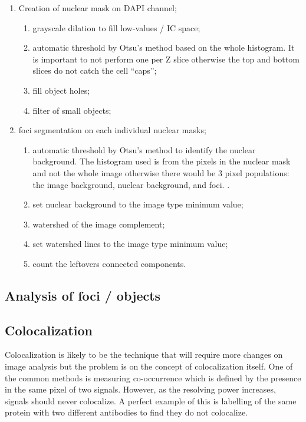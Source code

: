    \begin{enumerate}
      \item Creation of nuclear mask on DAPI channel;
      \begin {enumerate}
        \item grayscale dilation to fill low-values / IC space;
        \item automatic threshold by Otsu's method based on the whole
              histogram.  It is important to not perform one per Z slice
              otherwise the top and bottom slices do not catch the cell
              ``caps'';
        \item fill object holes;
        \item filter of small objects;
      \end{enumerate}

      \item foci segmentation on each individual nuclear masks;
      \begin {enumerate}
        \item automatic threshold by Otsu's method to identify the nuclear
              background.  The histogram used is from the pixels in the
              nuclear mask and not the whole image otherwise there would be
              3 pixel populations: the image background, nuclear background,
              and foci.  .
        \item set nuclear background to the image type minimum value;
        \item watershed of the image complement;
        \item set watershed lines to the image type minimum value;
        \item count the leftovers connected components.
      \end{enumerate}
    \end{enumerate}


  \subsection{Analysis of foci / objects}


  \subsection{Colocalization}
    Colocalization is likely to be the technique that will require more
    changes on image analysis but the problem is on the concept of
    colocalization itself.  One of the common methods is measuring
    co-occurrence which is defined by the presence in the same pixel of
    two signals.  However, as the resolving power increases, signals should
    never colocalize.  A perfect example of this is labelling of the same
    protein with two different antibodies to find they do not
    colocalize.

